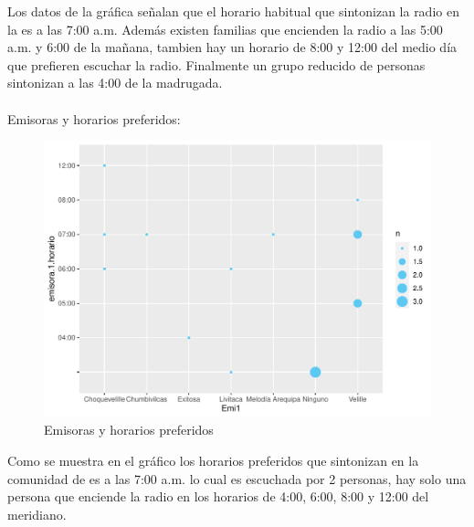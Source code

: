 \documentclass[12pt]{article}\usepackage[]{graphicx}\usepackage[]{xcolor}
\makeatletter
\def\maxwidth{ %
  \ifdim\Gin@nat@width>\linewidth
    \linewidth
  \else
    \Gin@nat@width
  \fi
}
\newenvironment{knitrout}{}{} %
\makeatother
\begin{document}
	Los datos de la gráfica señalan que el horario habitual que sintonizan la radio en la \comunidad es a las 7:00 a.m. Además existen familias que encienden la radio a las 5:00 a.m. y 6:00 de la mañana, tambien hay un horario de 8:00 y 12:00 del medio día que prefieren escuchar la radio. Finalmente un grupo reducido de personas sintonizan a las 4:00 de la madrugada.\\
	\\
Emisoras y horarios preferidos:
	\begin{figure}[H]
	\centering
\begin{knitrout}
\color{fgcolor}
\includegraphics[width=\maxwidth]{figure/three-1} 
\end{knitrout}
	\caption{Emisoras y horarios preferidos}
	\end{figure}
	Como se muestra en el gráfico los horarios preferidos  que sintonizan en la comunidad de \comunidad es a las 7:00 a.m. lo cual es escuchada por 2 personas, hay solo una persona que enciende la radio en los horarios de 4:00, 6:00, 8:00 y 12:00 del meridiano.\\ 
	\\
	
\end{document}
